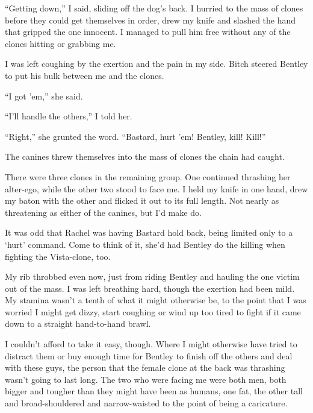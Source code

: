 ``Getting down,'' I said, sliding off the dog's back.  I hurried to the mass of clones before they could get themselves in order, drew my knife and slashed the hand that gripped the one innocent.  I managed to pull him free without any of the clones hitting or grabbing me.



I was left coughing by the exertion and the pain in my side.  Bitch steered Bentley to put his bulk between me and the clones.



``I got 'em,'' she said.



``I'll handle the others,'' I told her.



``Right,'' she grunted the word. ``Bastard, hurt 'em!  Bentley, kill!  Kill!''



The canines threw themselves into the mass of clones the chain had caught.



There were three clones in the remaining group.  One continued thrashing her alter-ego, while the other two stood to face me.  I held my knife in one hand, drew my baton with the other and flicked it out to its full length.  Not nearly as threatening as either of the canines, but I'd make do.



It was odd that Rachel was having Bastard hold back, being limited only to a `hurt' command.  Come to think of it, she'd had Bentley do the killing when fighting the Vista-clone, too.



My rib throbbed even now, just from riding Bentley and hauling the one victim out of the mass.  I was left breathing hard, though the exertion had been mild.  My stamina wasn't a tenth of what it might otherwise be, to the point that I was worried I might get dizzy, start coughing or wind up too tired to fight if it came down to a straight hand-to-hand brawl.



I couldn't afford to take it easy, though.  Where I might otherwise have tried to distract them or buy enough time for Bentley to finish off the others and deal with these guys, the person that the female clone at the back was thrashing wasn't going to last long.  The two who were facing me were both men, both bigger and tougher than they might have been as humans, one fat, the other tall and broad-shouldered and narrow-waisted to the point of being a caricature.




